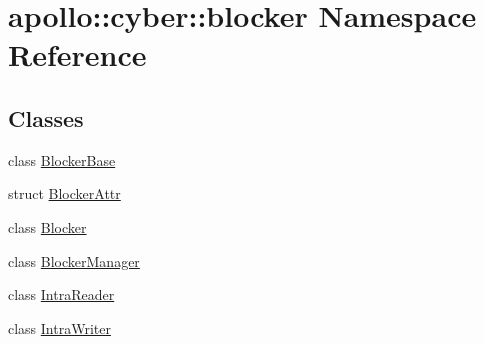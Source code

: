 \hypertarget{namespaceapollo_1_1cyber_1_1blocker}{\section{apollo\-:\-:cyber\-:\-:blocker Namespace Reference}
\label{namespaceapollo_1_1cyber_1_1blocker}
}
\subsection*{Classes}
\begin{DoxyCompactItemize}
\item 
class \hyperlink{classapollo_1_1cyber_1_1blocker_1_1BlockerBase}{Blocker\-Base}
\item 
struct \hyperlink{structapollo_1_1cyber_1_1blocker_1_1BlockerAttr}{Blocker\-Attr}
\item 
class \hyperlink{classapollo_1_1cyber_1_1blocker_1_1Blocker}{Blocker}
\item 
class \hyperlink{classapollo_1_1cyber_1_1blocker_1_1BlockerManager}{Blocker\-Manager}
\item 
class \hyperlink{classapollo_1_1cyber_1_1blocker_1_1IntraReader}{Intra\-Reader}
\item 
class \hyperlink{classapollo_1_1cyber_1_1blocker_1_1IntraWriter}{Intra\-Writer}
\end{DoxyCompactItemize}
